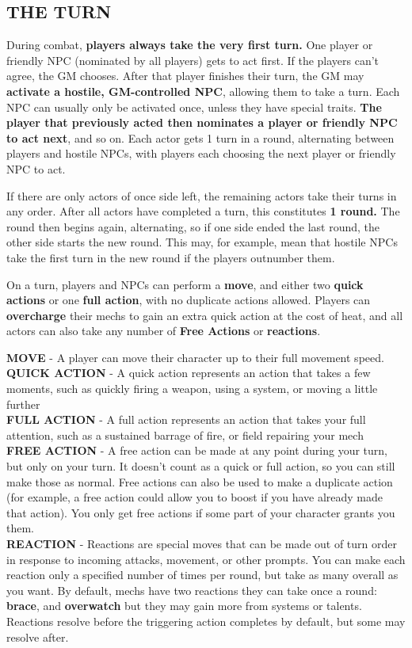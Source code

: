 \subsection{THE TURN}
During combat, \textbf{players always take the very first turn.} One player or friendly NPC (nominated by all players) gets to act first. If the players can’t agree, the GM chooses. After that player finishes their turn, the GM may \textbf{activate a hostile, GM-controlled NPC}, allowing them to take a turn. Each NPC can usually only be activated once, unless they have special traits. \textbf{The player that previously acted then nominates a player or friendly NPC to act next}, and so on. Each actor gets 1 turn in a round, alternating between players and hostile NPCs, with players each choosing the next player or friendly NPC to act.

If there are only actors of once side left, the remaining actors take their turns in any order. After all actors have completed a turn, this constitutes \textbf{1 round.} The round then begins again, alternating, so if one side ended the last round, the other side starts the new round. This may, for example, mean that hostile NPCs take the first turn in the new round if the players outnumber them.

On a turn, players and NPCs can perform a \textbf{move}, and either two \textbf{quick actions} or one \textbf{full action}, with no duplicate actions allowed. Players can \textbf{overcharge} their mechs to gain an extra quick action at the cost of heat, and all actors can also take any number of \textbf{Free Actions} or \textbf{reactions}.

\textbf{MOVE} - A player can move their character up to their full movement speed.\\
\textbf{QUICK ACTION} - A quick action represents an action that takes a few moments, such as quickly firing a weapon, using a system, or moving a little further\\
\textbf{FULL ACTION} - A full action represents an action that takes your full attention, such as a sustained barrage of fire, or field repairing your mech\\
\textbf{FREE ACTION} - A free action can be made at any point during your turn, but only on your turn. It doesn’t count as a quick or full action, so you can still make those as normal. Free actions can also be used to make a duplicate action (for example, a free action could allow you to boost if you have already made that action). You only get free actions if some part of your character grants you them.\\
\textbf{REACTION} - Reactions are special moves that can be made out of turn order in response to incoming attacks, movement, or other prompts. You can make each reaction only a specified number of times per round, but take as many overall as you want. By default, mechs have two reactions they can take once a round: \textbf{brace}, and \textbf{overwatch} but they may gain more from systems or talents. Reactions resolve before the triggering action completes by default, but some may resolve after.

